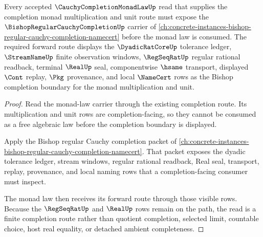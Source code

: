 \begin{theorem}
\label{thm:cauchy-completion-monad-law-bishop-completion-forward-route}
Every accepted $\CauchyCompletionMonadLawUp$ read that supplies the completion monad multiplication and unit route must expose the $\BishopRegularCauchyCompletionUp$ carrier of \autoref{ch:concrete-instances-bishop-regular-cauchy-completion-namecert} before the monad law is consumed. The required forward route displays the $\DyadicRatCoreUp$ tolerance ledger, $\StreamNameUp$ finite observation windows, $\RegSeqRatUp$ regular rational readback, terminal $\RealUp$ seal, componentwise $\hsame$ transport, displayed $\Cont$ replay, $\Pkg$ provenance, and local $\NameCert$ rows as the Bishop completion boundary for the monad multiplication and unit.
\end{theorem}
\begin{proof}
Read the monad-law carrier through the existing completion route. Its multiplication and unit rows are completion-facing, so they cannot be consumed as a free algebraic law before the completion boundary is displayed.

Apply the Bishop regular Cauchy completion packet of \autoref{ch:concrete-instances-bishop-regular-cauchy-completion-namecert}. That packet exposes the dyadic tolerance ledger, stream windows, regular rational readback, Real seal, transport, replay, provenance, and local naming rows that a completion-facing consumer must inspect.

The monad law then receives its forward route through those visible rows. Because the $\RegSeqRatUp$ and $\RealUp$ rows remain on the path, the read is a finite completion route rather than quotient completion, selected limit, countable choice, host real equality, or detached ambient completeness.
\end{proof}
